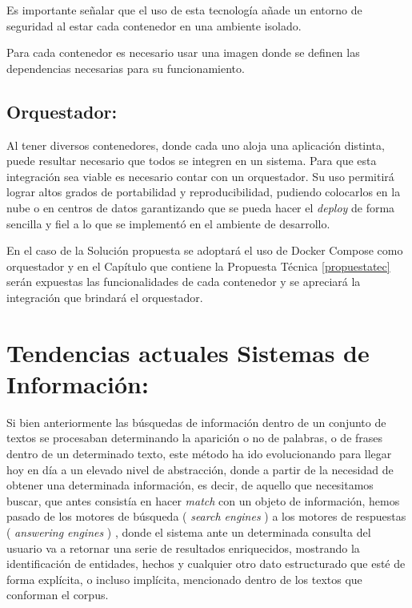 \documentclass[
  10,
  spanish,
  openany]{book}
\begin{document}
Es importante señalar que el uso de esta tecnología añade un entorno de seguridad al estar cada contenedor en una ambiente isolado.

Para cada contenedor es necesario usar una imagen donde se definen las dependencias necesarias para su funcionamiento.

\hypertarget{orquestador}{%
\subsection{Orquestador:}\label{orquestador}}

Al tener diversos contenedores, donde cada uno aloja una aplicación distinta, puede resultar necesario que todos se integren en un sistema. Para que esta integración sea viable es necesario contar con un orquestador. Su uso permitirá lograr altos grados de portabilidad y reproducibilidad, pudiendo colocarlos en la nube o en centros de datos garantizando que se pueda hacer el \emph{deploy} de forma sencilla y fiel a lo que se implementó en el ambiente de desarrollo.

En el caso de la Solución propuesta se adoptará el uso de Docker Compose como orquestador y en el Capítulo que contiene la Propuesta Técnica \ref{propuestatec} serán expuestas las funcionalidades de cada contenedor y se apreciará la integración que brindará el orquestador.

\hypertarget{tendencias-actuales-sistemas-de-informaciuxf3n}{%
\section{Tendencias actuales Sistemas de Información:}\label{tendencias-actuales-sistemas-de-informaciuxf3n}}

Si bien anteriormente las búsquedas de información dentro de un conjunto de textos se procesaban determinando la aparición o no de palabras, o de frases dentro de un determinado texto, este método ha ido evolucionando para llegar hoy en día a un elevado nivel de abstracción, donde a partir de la necesidad de obtener una determinada información, es decir, de aquello que necesitamos buscar, que antes consistía en hacer \emph{match} con un objeto de información, hemos pasado de los motores de búsqueda ( \emph{search engines} ) a los motores de respuestas ( \emph{answering engines} ) \citep{balog2018}, donde el sistema ante un determinada consulta del usuario va a retornar una serie de resultados enriquecidos, mostrando la identificación de entidades, hechos y cualquier otro dato estructurado que esté de forma explícita, o incluso implícita, mencionado dentro de los textos que conforman el corpus.
\end{document}
